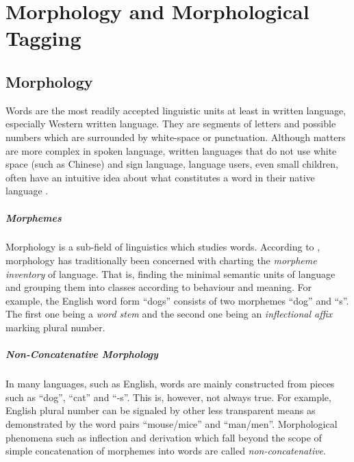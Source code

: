 \chapter{Morphology and Morphological Tagging}

\section{Morphology}

Words are the most readily accepted linguistic units at least in
written language, especially Western written language. They are
segments of letters and possible numbers which are surrounded by
white-space or punctuation. Although matters are more complex in
spoken language, written languages that do not use white space (such
as Chinese) and sign language, language users, even small children,
often have an intuitive idea about what constitutes a word in their
native language \cite{someone}.

\paragraph{Morphemes} Morphology is a sub-field of linguistics which
studies words. According to \cite{Bybee85}, morphology has
traditionally been concerned with charting the {\it morpheme
  inventory} of language. That is, finding the minimal semantic units
of language and grouping them into classes according to behaviour and
meaning. For example, the English word form ``dogs'' consists of two
morphemes ``dog'' and ``s''. The first one being a {\it word stem}
and the second one being an {\it inflectional affix} marking plural
number.

\paragraph{Non-Concatenative Morphology} In many languages, such as
English, words are mainly constructed from pieces such as ``dog'',
``cat'' and ``-s''. This is, however, not always true. For example,
English plural number can be signaled by other less transparent means
as demonstrated by the word pairs ``mouse/mice'' and
``man/men''. Morphological phenomena such as inflection and derivation
which fall beyond the scope of simple concatenation of morphemes into
words are called {\it non-concatenative}. 

